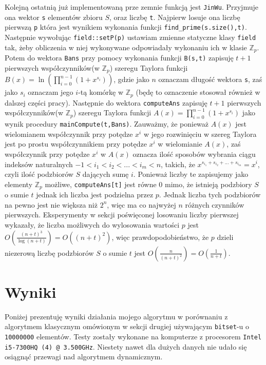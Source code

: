 \documentclass{article}
\begin{document}
Kolejną ostatnią już implementowaną prze zemnie funkcją jest \texttt{JinWu}. Przyjmuje ona wektor \texttt{s} 
elementów zbioru 
$S$, oraz
liczbę \texttt{t}. Najpierw losuje ona liczbę pierwszą \texttt{p} która jest wynikiem wykonania funkcji 
\texttt{find\_prime(s.size(),t)}. Następnie
wywołując \texttt{field::setP(p)} ustawiam zmienne statyczne klasy \texttt{field} tak, żeby obliczenia w niej wykonywane 
odpowiadały wykonaniu ich w klasie $\mathbb{Z}_p$. Potem do wektora \texttt{Bans} przy pomocy wykonania funkcji 
\texttt{B(s,t)} zapisuję
$t+1$ pierwszych współczynników(w $\mathbb{Z}_p$) szeregu Taylora funkcji $B(x)=\ln(\prod_{i=0}^{n-1}(1+x^{s_i}))$, gdzie jako $n$ oznaczam długość
wektora \texttt{s}, zaś jako $s_i$ oznaczam jego $i$-tą komórkę w $\mathbb{Z}_p$ (będę to oznaczenie stosował również w dalszej części pracy). 
Następnie do wektora \texttt{computeAns} zapisuję $t+1$ pierwszych współczynników(w $\mathbb{Z}_p$) szeregu Taylora funkcji 
$A(x)=\prod_{i=0}^{n-1}(1+x^{s_i})$ jako wynik procedury \texttt{mainCompute(t,Bans)}. 
Zauważmy, że ponieważ $A(x)$ jest wielomianem współczynnik
przy potędze $x^i$ w jego rozwinięciu w szereg Taylora jest po prostu współczynnikiem przy potędze $x^i$ w wielomianie $A(x)$, zaś współczynnik przy potędze $x^i$ w $A(x)$ oznacza ilość sposobów wybrania ciągu indeksów naturalnych $-1<i_1<i_2<...<i_m<n$, 
takich, że
$x^{s_{i_1}+s_{i_2}+...+s_{i_m}}=x^i$, czyli ilość podzbiorów $S$ dających sumę $i$. Ponieważ liczby te zapisujemy jako elementy 
$\mathbb{Z}_p$ możliwe, \texttt{computeAns[t]} jest równe $0$ mimo, że istnieją podzbiory $S$ o sumie $t$ jednak ich liczba jest podzielna
przez $p$. Jednak liczba tych podzbiorów na pewno jest nie większa niż $2^n$, więc ma co najwyżej $n$ różnych czynników pierwszych.
Eksperymenty w sekcji poświęconej losowaniu liczby pierwszej wykazały, że liczba możliwych do wylosowania wartości $p$
jest $O(\frac{(n+t)^3}{\log(n+t)})=O((n+t)^2)$, więc prawdopodobieństwo, że $p$ dzieli niezerową liczbę podzbiorów $S$ o sumie $t$
jest $O(\frac{n}{(n+t)^2})=O(\frac{1}{n+t})$.

\section{Wyniki}
Poniżej prezentuję wyniki działania mojego algorytmu w porównaniu z algorytmem klasycznym omówionym w sekcji drugiej
używającym \texttt{bitset}-u o \texttt{10000000} elementów.
Testy zostały wykonane na komputerze z procesorem \texttt{Intel i5-7300HQ (4) @ 3.500GHz}. Niestety nawet dla dużych
danych nie udało się osiągnąć przewagi nad algorytmem dynamicznym.
\end{document}
